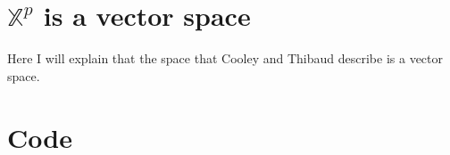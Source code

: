 \documentclass[11pt, oneside]{book}
\theoremstyle{plain}
\theoremstyle{remark}
\begin{document}
\chapter{$\mathbb{X}^p$ is a vector space}
Here I will explain that the space that Cooley and Thibaud describe is a vector
space.

\chapter{Code}

\newpage
\printbibliography


  
\end{document}
